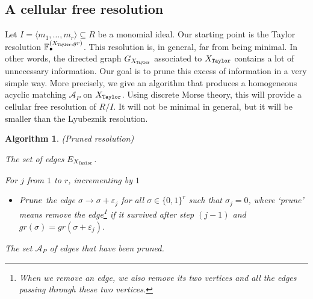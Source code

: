 \documentclass[12pt]{amsart}
\newtheorem{algorithm}[theorem]{Algorithm}
\theoremstyle{definition}
\theoremstyle{remark}
\numberwithin{equation}{section}
\newcommand{\cA}{{\mathcal A}}
\newcommand{\lra}{{\longrightarrow}}
\newcommand{\phil}[1]{{\color{red} \sf $\star\star$ Philippe: [#1]}}
\begin{document}
\vskip 2mm

\subsection{A cellular free resolution} \label{pruned1}

Let $I=\langle m_1,\dots, m_r \rangle \subseteq R$ be a monomial ideal.
Our starting point is the Taylor resolution $\mathbb{F}_{\bullet}^{(X_{\tt Taylor}, gr)}$.
This resolution is, in general, far from being minimal. In other words, the directed graph $G_{X_{\tt Taylor}}$ associated to ${X_{\tt Taylor}}$
contains a lot of unnecessary information.  Our goal is to prune  this
excess of information in a very simple way. More precisely, we give an algorithm that produces a homogeneous
acyclic matching $\cA_P$ on  ${X_{\tt Taylor}}$. Using
discrete Morse theory, this will provide a cellular free resolution of $R/I$.
It will not be minimal in general, but it will be smaller than the Lyubeznik resolution.

\vskip 2mm

\begin{algorithm}\label{alg1} { (Pruned resolution)}

\vskip 2mm

{\rm {} The set of edges $E_{X_{\tt Taylor}}$.


\vskip 2mm



For $j$ from $1$ to $r$, incrementing by $1$

\vskip 2mm

\begin{itemize}

\item[\textbf{(j)}] ${\it Prune}$ the edge ${\sigma} \lra{\sigma + \varepsilon_j}$ for
all $\sigma \in \{0,1\}^r$ such that $\sigma_j=0$, where `prune'
means remove the edge\footnote{When we remove an edge, we also remove its two vertices and all the edges
passing through these two vertices.}
if it survived after step $(j-1)$ and
$gr(\sigma)=gr(\sigma + \varepsilon_j) $.

\end{itemize}

\vskip 2mm


 The set $\cA_P$ of edges that have been pruned.

}

\end{algorithm}
\end{document}
